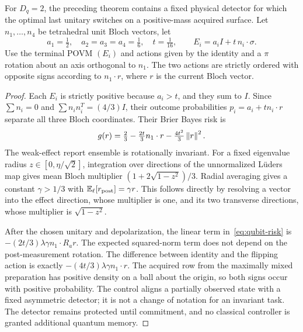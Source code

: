 \begin{proposition}\label{prop:qubit-switch}
For $D_q=2$, the preceding theorem contains a fixed physical detector for which the optimal last unitary switches on a positive-mass acquired surface. Let $n_1,\ldots,n_4$ be tetrahedral unit Bloch vectors, let
\[
 a_1=\tfrac12,\quad a_2=a_3=a_4=\tfrac16,\quad t=\tfrac1{16},
 \qquad E_i=a_iI+t\,n_i\cdot\sigma.
\]
Use the terminal POVM $(E_i)$ and actions given by the identity and a $\pi$ rotation about an axis orthogonal to $n_1$. The two actions are strictly ordered with opposite signs according to $n_1\cdot r$, where $r$ is the current Bloch vector.
\end{proposition}
\begin{proof}
Each $E_i$ is strictly positive because $a_i>t$, and they sum to $I$. Since $\sum n_i=0$ and $\sum n_in_i^T=(4/3)I$, their outcome probabilities $p_i=a_i+t n_i\cdot r$ separate all three Bloch coordinates. Their Brier Bayes risk is
\begin{equation}\label{eq:qubit-risk}
 g(r)=\tfrac23-\tfrac{2t}{3}n_1\cdot r-\tfrac{4t^2}{3}\left\lVert r\right\rVert^2.
\end{equation}
The weak-effect report ensemble is rotationally invariant. For a fixed eigenvalue radius $z\in[0,\eta/\sqrt2]$, integration over directions of the unnormalized L\"uders map gives mean Bloch multiplier $(1+2\sqrt{1-z^2})/3$. Radial averaging gives a constant $\gamma>1/3$ with $\mathbb E_\ell[r_{\rm post}]=\gamma r$. This follows directly by resolving a vector into the effect direction, whose multiplier is one, and its two transverse directions, whose multiplier is $\sqrt{1-z^2}$.

After the chosen unitary and depolarization, the linear term in~\eqref{eq:qubit-risk} is $-(2t/3)\lambda\gamma n_1\cdot R_ar$. The expected squared-norm term does not depend on the post-measurement rotation. The difference between identity and the flipping action is exactly
$-(4t/3)\lambda\gamma n_1\cdot r$.
The acquired row from the maximally mixed preparation has positive density on a ball about the origin, so both signs occur with positive probability. The control aligns a partially observed state with a fixed asymmetric detector; it is not a change of notation for an invariant task. The detector remains protected until commitment, and no classical controller is granted additional quantum memory.
\end{proof}
